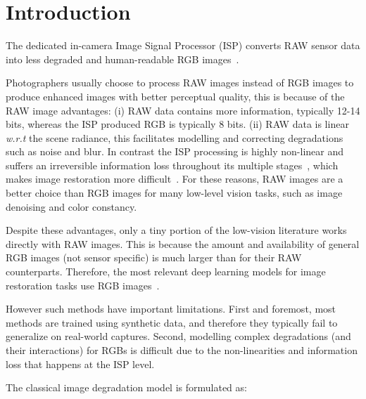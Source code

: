 \documentclass{article}
\begin{document}
\section{Introduction}
\label{sec:introduction}



The dedicated in-camera Image Signal Processor (ISP) converts RAW sensor data into less degraded and human-readable RGB images~\cite{schwartz2018deepisp,zhang2019zoom, conde2022modelbased}.

Photographers usually choose to process RAW images instead of RGB images to produce enhanced images with better perceptual quality, this is because of the RAW image advantages: 
%
(i) RAW data contains more information, typically 12-14 bits, whereas the ISP produced RGB is typically 8 bits. 
%
(ii) RAW data is linear \emph{w.r.t} the scene radiance, this facilitates modelling and correcting degradations such as noise and blur.
In contrast the ISP processing is highly non-linear and suffers an irreversible information loss throughout its multiple stages~\cite{karaimer2016software, brooks2019unprocessing}, which makes image restoration more difficult~\cite{delbracio2021mobile, xu2019rawsr}.
%
For these reasons, RAW images are a better choice than RGB images for many low-level vision tasks, such as image denoising and color constancy.%


Despite these advantages, only a tiny portion of the low-vision literature works directly with RAW images. This is because the amount and availability of general RGB images (not sensor specific) is much larger than for their RAW counterparts. %
%
Therefore, the most relevant deep learning models for image restoration tasks use RGB images~\cite{zamir2022restormer, chen2022simple}. 

However such methods have important limitations. First and foremost, most methods are trained using synthetic data, and therefore they typically fail to generalize on real-world captures. Second, modelling complex degradations (and their interactions) for RGBs is difficult due to the non-linearities and information loss that happens at the ISP level.

The classical image degradation model is formulated as: %
\end{document}
